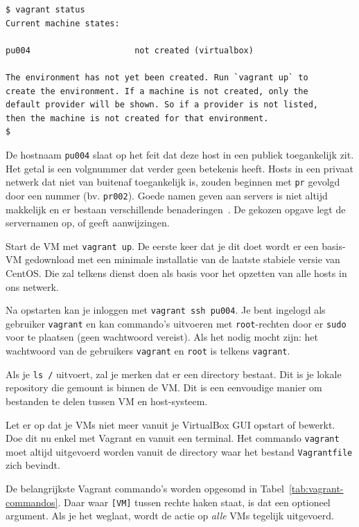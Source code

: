 \begin{verbatim}
$ vagrant status
Current machine states:

pu004                     not created (virtualbox)

The environment has not yet been created. Run `vagrant up` to
create the environment. If a machine is not created, only the
default provider will be shown. So if a provider is not listed,
then the machine is not created for that environment.
$
\end{verbatim}

De hostnaam \texttt{pu004} slaat op het feit dat deze host in een publiek toegankelijk zit. Het getal is een volgnummer dat verder geen betekenis heeft. Hosts in een privaat netwerk dat niet van buitenaf toegankelijk is, zouden beginnen met \texttt{pr} gevolgd door een nummer (bv. \texttt{pr002}). Goede namen geven aan servers is niet altijd makkelijk en er bestaan verschillende benaderingen~\autocite{Mytton2015,mnxio}. De gekozen opgave legt de servernamen op, of geeft aanwijzingen.

Start de VM met \texttt{vagrant\ up}. De eerste keer dat je dit doet wordt er een basis-VM gedownload met een minimale installatie van de laatste stabiele versie van CentOS. Die zal telkens dienst doen als basis voor het opzetten van alle hosts in ons netwerk.

Na opstarten kan je inloggen met \texttt{vagrant\ ssh\ pu004}. Je bent ingelogd als gebruiker \texttt{vagrant} en kan commando's uitvoeren met \texttt{root}-rechten door er \texttt{sudo} voor te plaatsen (geen wachtwoord vereist). Als het nodig mocht zijn: het wachtwoord van de gebruikers \texttt{vagrant} en \texttt{root} is telkens \texttt{vagrant}.

Als je \texttt{ls\ /} uitvoert, zal je merken dat er een directory  bestaat. Dit is je lokale repository die gemount is binnen de VM. Dit is een eenvoudige manier om bestanden te delen tussen VM en host-systeem.

Let er op dat je VMs niet meer vanuit je VirtualBox GUI opstart of bewerkt. Doe dit nu enkel met Vagrant en vanuit een terminal. Het commando \texttt{vagrant} moet altijd uitgevoerd worden vanuit de directory waar het bestand \texttt{Vagrantfile} zich bevindt.

De belangrijkste Vagrant commando's worden opgesomd in Tabel~\ref{tab:vagrant-commandos}. Daar waar \texttt{[VM]} tussen rechte haken staat, is dat een optioneel argument. Als je het weglaat, wordt de actie op \emph{alle} VMs tegelijk uitgevoerd.

